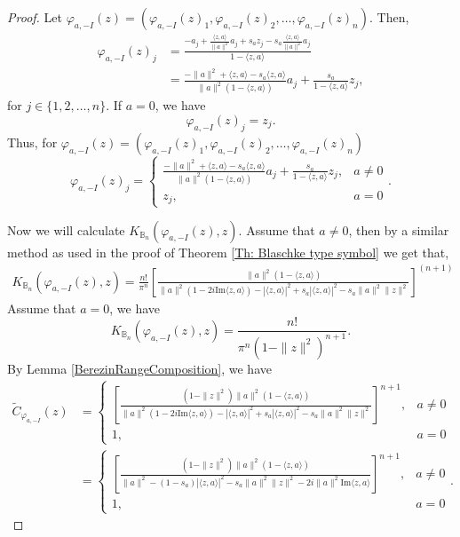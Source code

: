 \documentclass{amsart}
\theoremstyle{remark}
\newcommand{\B}{\mathbb{B}}
\begin{document}
\begin{proof}
Let $\varphi_{a,-I}(z) = (\varphi_{a,-I}(z)_{1}, \varphi_{a,-I}(z)_{2}, \dots ,\varphi_{a,-I}(z)_{n})$. Then, 
    \begin{align*}
        \varphi_{a,-I}(z)_{j} &= \frac{-a_{j} + \frac{\langle z,a \rangle}{\|a\|^{2}}a_{j} + s_{a}z_{j} - s_{a}\frac{\langle z,a \rangle}{\|a\|^{2}}a_{j}}{1 - \langle z,a \rangle} \\
        &= \frac{-\|a\|^{2} + \langle z,a \rangle - s_{a}\langle z,a \rangle}{\|a\|^{2}(1 - \langle z,a \rangle)}a_{j} + \frac{s_{a}}{1 - \langle z,a \rangle}z_{j},
    \end{align*}
for $j \in \{1,2,\dots,n\}$. If $a = 0$, we have
\begin{equation*}
    \varphi_{a,-I}(z)_{j} = z_{j}.
\end{equation*}
Thus, for $\varphi_{a,-I}(z) = (\varphi_{a,-I}(z)_{1}, \varphi_{a,-I}(z)_{2}, \dots ,\varphi_{a,-I}(z)_{n})$ 
    \begin{equation*}
        \varphi_{a,-I}(z)_{j} =
        \begin{cases}
            \frac{-\|a\|^{2} + \langle z,a \rangle - s_{a}\langle z,a \rangle}{\|a\|^{2}(1 - \langle z,a \rangle)}a_{j} + \frac{s_{a}}{1 - \langle z,a \rangle}z_{j}, & a \neq 0 \\
            z_{j}, & a = 0
        \end{cases}.
    \end{equation*}
    
Now we will calculate $K_{\B_{n}}(\varphi_{a,-I}(z),z)$. Assume that $a \neq 0$, then by a similar method as used in the proof of Theorem \ref{Th: Blaschke type symbol} we get that,
    \begin{align*}
        K_{\B_{n}}(\varphi_{a,-I}(z),z) = \frac{n!}{\pi^{n}}\left[\frac{\|a\|^{2}(1 - \langle z,a \rangle)}{\|a\|^{2}(1-2i\mathrm{Im}\langle z,a \rangle) - |\langle z,a \rangle|^2 + s_{a}|\langle z,a \rangle|^2 - s_{a}\|a\|^2\|z\|^2}\right]^{(n+1)}
\end{align*}
Assume that $a = 0$, we have 
\[K_{\B_{n}}(\varphi_{a,-I}(z),z) = \frac{n!}{\pi^{n}(1-\|z\|^{2})^{n+1}}.\]
By Lemma \ref{BerezinRangeComposition}, we have
     \begin{align*}
        \widetilde{C}_{\varphi_{a,-I}}(z) &= 
        \begin{cases}
            \left[\frac{(1 - \|z\|^{2})\|a\|^{2}(1 - \langle z,a \rangle)}{\|a\|^{2}(1-2i\mathrm{Im}\langle z,a \rangle) - |\langle z,a \rangle|^2 + s_{a}|\langle z,a \rangle|^2 - s_{a}\|a\|^2\|z\|^2}\right]^{n+1}, & a \neq 0 \\
            1, & a = 0
        \end{cases}
        \\
        &= 
        \begin{cases}
            \left[\frac{(1 - \|z\|^{2})\|a\|^{2}(1 - \langle z,a \rangle)}{\|a\|^{2} - (1-s_a)|\langle z,a \rangle|^2 - s_{a}\|a\|^2\|z\|^2-2i\|a\|^{2}\mathrm{Im}\langle z,a \rangle}\right]^{n+1}, & a \neq 0 \\
            1, & a = 0
        \end{cases}
        .
    \end{align*}
\end{proof}
\end{document}
